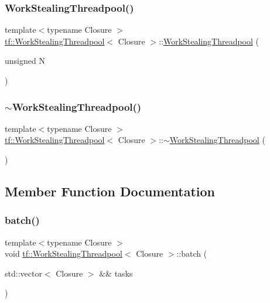 \subsubsection{\texorpdfstring{Work\+Stealing\+Threadpool()}{WorkStealingThreadpool()}}
{\footnotesize\ttfamily template$<$typename Closure $>$ \\
\hyperlink{classtf_1_1WorkStealingThreadpool}{tf\+::\+Work\+Stealing\+Threadpool}$<$ Closure $>$\+::\hyperlink{classtf_1_1WorkStealingThreadpool}{Work\+Stealing\+Threadpool} (\begin{DoxyParamCaption}\item[{unsigned}]{N }\end{DoxyParamCaption})}

\mbox{\label{classtf_1_1WorkStealingThreadpool_aa18a26ff7202b289b983ce960d4ff5b9}} 
\subsubsection{\texorpdfstring{$\sim$\+Work\+Stealing\+Threadpool()}{~WorkStealingThreadpool()}}
{\footnotesize\ttfamily template$<$typename Closure $>$ \\
\hyperlink{classtf_1_1WorkStealingThreadpool}{tf\+::\+Work\+Stealing\+Threadpool}$<$ Closure $>$\+::$\sim$\hyperlink{classtf_1_1WorkStealingThreadpool}{Work\+Stealing\+Threadpool} (\begin{DoxyParamCaption}{ }\end{DoxyParamCaption})}



\subsection{Member Function Documentation}
\mbox{\label{classtf_1_1WorkStealingThreadpool_af8aea2f24e9dd9de605080472568e644}} 
\subsubsection{\texorpdfstring{batch()}{batch()}}
{\footnotesize\ttfamily template$<$typename Closure $>$ \\
void \hyperlink{classtf_1_1WorkStealingThreadpool}{tf\+::\+Work\+Stealing\+Threadpool}$<$ Closure $>$\+::batch (\begin{DoxyParamCaption}\item[{std\+::vector$<$ Closure $>$ \&\&}]{tasks }\end{DoxyParamCaption})}

